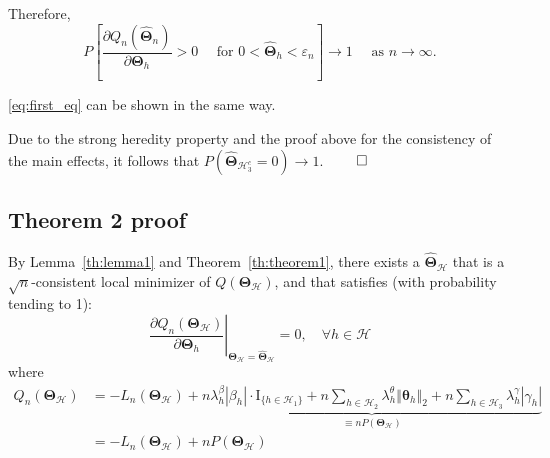 \documentclass[12pt,letter]{article}\usepackage[]{graphicx}\usepackage[]{color}
\newcommand{\bTheta}{\boldsymbol{\Theta}}
\newcommand{\btheta}{\boldsymbol{\theta}}
\begin{document}
Therefore,
\[
P\left[\frac{\partial Q_{n}\left(\widehat{\boldsymbol{\Theta}}_{n}\right)}{\partial\bTheta_{h}}>0\quad\text{ for }0<\widehat{\bTheta}_{h}<\varepsilon_{n}\right]\rightarrow1\quad\text{ as }n\rightarrow\infty.
\]

\eqref{eq:first_eq} can be shown in the same way. 

Due to the strong heredity property and the proof above for the consistency of the main effects, it follows that $P\left(\widehat{\bTheta}_{\mathcal{H}_{3}^{c}}=0\right)\rightarrow1$. $\qed$

\subsection{Theorem 2 proof} \label{ap:theorem2proof}

By Lemma~\eqref{th:lemma1} and Theorem~\eqref{th:theorem1}, there exists a $\widehat{\bTheta}_{\mathcal{H}}$ that is a $\sqrt{n}$-consistent local minimizer of $Q(\bTheta_{\mathcal{H}})$, and that satisfies (with probability tending to 1):
\begin{equation}
\left.\frac{\partial Q_{n}\left(\boldsymbol{\Theta}_{\mathcal{H}}\right)}{\partial\bTheta_{h}}\right|_{\boldsymbol{\Theta}_{\mathcal{H}}=\widehat{\boldsymbol{\Theta}}_{\mathcal{H}}}=0,\quad\forall h\in\mathcal{H}\label{eq:eq_14}
\end{equation}
where
\begin{align}
Q_n(\bTheta_{\mathcal{H}})
&=-L_n(\bTheta_{\mathcal{H}})+\underbrace{n\lambda_{h}^{\beta}\left|\beta_{h}\right| \cdot \textrm{I}_{\lbrace h \in \mathcal{H}_1 \rbrace} + n\sum_{h \in \mathcal{H}_2}      \lambda_{h}^{\theta}\left\Vert \btheta_{h}\right\Vert _{2}  +n\sum_{h \in \mathcal{H}_3}\lambda_{h}^{\gamma}\left|\gamma_{h}\right|}_{\equiv n P(\bTheta_{\mathcal{H}})} \nonumber \\
& = -L_n(\bTheta_{\mathcal{H}})+n P(\bTheta_{\mathcal{H}}) \label{eq:eq_14.5}
\end{align}
\end{document}

